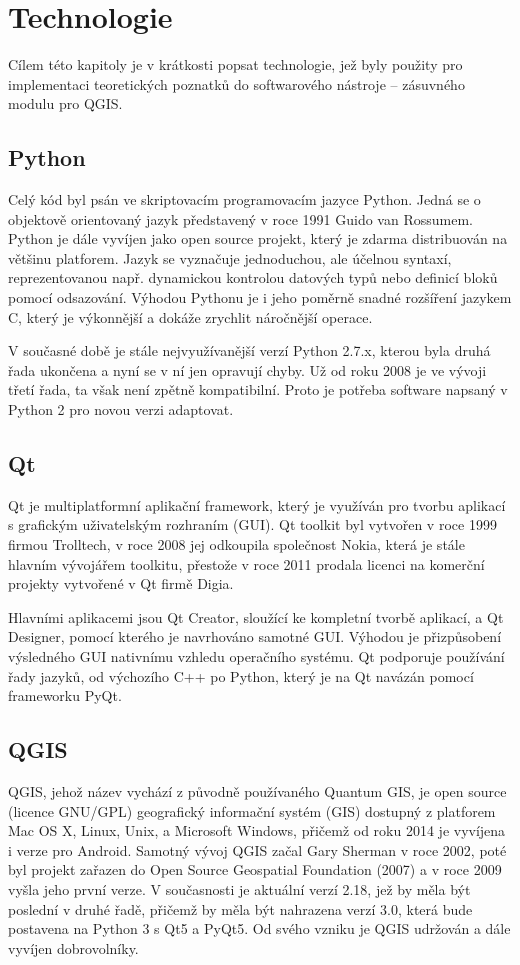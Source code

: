 \chapter{Technologie}
\label{3-technologie}
Cílem této kapitoly je v krátkosti popsat technologie, jež byly použity pro implementaci teoretických poznatků do softwarového nástroje – zásuvného modulu pro QGIS.
\section{Python}
Celý kód byl psán ve skriptovacím programovacím jazyce Python. Jedná se o objektově orientovaný jazyk představený v roce 1991 Guido van Rossumem. Python je dále vyvíjen jako open source projekt, který je zdarma distribuován na většinu platforem. Jazyk se vyznačuje jednoduchou, ale účelnou syntaxí, reprezentovanou např. dynamickou kontrolou datových typů nebo definicí bloků pomocí odsazování. Výhodou Pythonu je i jeho poměrně snadné rozšíření jazykem C, který je výkonnější a dokáže zrychlit náročnější operace.

V současné době je stále nejvyužívanější verzí Python 2.7.x, kterou byla druhá řada ukončena a nyní se v ní jen opravují chyby. Už od roku 2008 je ve vývoji třetí řada, ta však není zpětně kompatibilní. Proto je potřeba software napsaný v Python 2 pro novou verzi adaptovat.
\section{Qt}
Qt je multiplatformní aplikační framework, který je využíván pro tvorbu aplikací s grafickým uživatelským rozhraním (GUI). Qt toolkit byl vytvořen v roce 1999 firmou Trolltech, v roce 2008 jej odkoupila společnost Nokia, která je stále hlavním vývojářem toolkitu, přestože v roce 2011 prodala licenci na komerční projekty vytvořené v Qt firmě Digia.

Hlavními aplikacemi jsou Qt Creator, sloužící ke kompletní tvorbě aplikací, a Qt Designer, pomocí kterého je navrhováno samotné GUI. Výhodou je přizpůsobení výsledného GUI nativnímu vzhledu operačního systému. Qt podporuje používání řady jazyků, od výchozího C++ po Python, který je na Qt navázán pomocí frameworku PyQt.
\section{QGIS}
QGIS, jehož název vychází z původně používaného Quantum GIS, je open source (licence GNU/GPL) geografický informační systém (GIS) dostupný z platforem Mac OS X, Linux, Unix, a Microsoft Windows, přičemž od roku 2014 je vyvíjena i verze pro Android. Samotný vývoj QGIS začal Gary Sherman v roce 2002, poté byl projekt zařazen do Open Source Geospatial Foundation (2007) a v roce 2009 vyšla jeho první verze. V současnosti je aktuální verzí 2.18, jež by měla být poslední v druhé řadě, přičemž by měla být nahrazena verzí 3.0, která bude postavena na Python 3 s Qt5 a PyQt5. Od svého vzniku je QGIS udržován a dále vyvíjen dobrovolníky.

